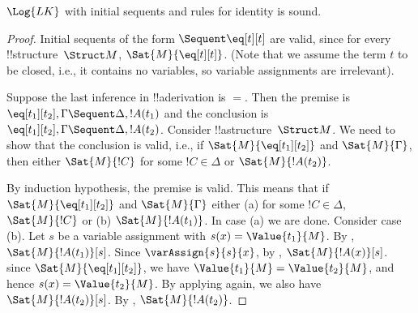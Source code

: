 \documentclass[../../../include/open-logic-section]{subfiles}
\begin{document}


\begin{prop}
$\Log{LK}$ with initial sequents and rules for identity is sound.
\end{prop}

\begin{proof}
Initial sequents of the form ${} \Sequent \eq[t][t]$ are valid, since
for every !!{structure}~$\Struct M$, $\Sat{M}{\eq[t][t]}$. (Note that
we assume the term $t$ to be closed, i.e., it contains no variables,
so variable assignments are irrelevant).

Suppose the last inference in !!a{derivation} is $=$. Then the premise
is $\eq[t_1][t_2], \Gamma \Sequent \Delta, !A(t_1)$ and the conclusion
is $\eq[t_1][t_2], \Gamma \Sequent \Delta, !A(t_2)$. Consider
!!a{structure}~$\Struct M$. We need to show that the conclusion is
valid, i.e., if $\Sat{M}{\eq[t_1][t_2]}$ and $\Sat{M}{\Gamma}$, then
either $\Sat{M}{!C}$ for some $!C \in \Delta$ or $\Sat{M}{!A(t_2)}$.

By induction hypothesis, the premise is valid. This means that if
$\Sat{M}{\eq[t_1][t_2]}$ and $\Sat{M}{\Gamma}$ either (a) for some $!C
\in \Delta$, $\Sat{M}{!C}$ or (b) $\Sat{M}{!A(t_1)}$. In case (a) we
are done. Consider case (b).  Let $s$ be a variable assignment with
$s(x) = \Value{t_1}{M}$.  By ,
$\Sat{M}{!A(t_1)}[s]$. Since $\varAssign{s}{s}{x}$, by
, $\Sat{M}{!A(x)}[s]$. since
$\Sat{M}{\eq[t_1][t_2]}$, we have $\Value{t_1}{M} = \Value{t_2}{M}$,
and hence $s(x) = \Value{t_2}{M}$.  By applying
 again, we also have
$\Sat{M}{!A(t_2)}[s]$.  By ,
$\Sat{M}{!A(t_2)}$.
\end{proof}
\end{document}
